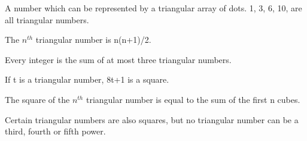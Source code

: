 A number which can be represented by a triangular array of dots.
1, 3, 6, 10, are all triangular numbers.

\par
 The $n^{th}$  triangular number is n(n+1)/2.
\par
Every integer is the sum of at most three triangular 
numbers.
\par
If t is a triangular number, 8t+1 is a square.
\par
The square of the $n^{th}$  triangular number is equal
to the sum of the first n cubes.
\par
Certain triangular numbers are also squares, but no triangular
number can be a third, fourth or fifth power.
